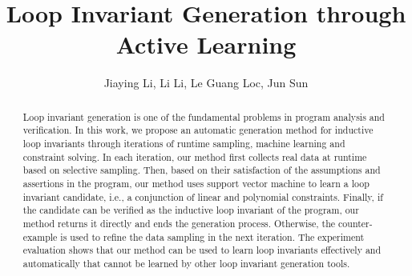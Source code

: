 \documentclass{llncs}
\begin{document}
\title{Loop Invariant Generation through Active Learning}
\author{
Jiaying Li, Li Li, Le Guang Loc, Jun Sun\\
}

\maketitle

\begin{abstract}
	Loop invariant generation is one of the fundamental problems in program analysis and verification. 
    In this work, we propose an automatic generation method for inductive loop invariants 
    through iterations of runtime sampling, machine learning and constraint solving. 
    In each iteration, our method first collects real data at runtime based on selective sampling. 
    Then, based on their satisfaction of the assumptions and assertions in the program, 
    our method uses support vector machine to learn a loop invariant candidate, 
    i.e., a conjunction of linear and polynomial constraints. 
    Finally, if the candidate can be verified as the inductive loop invariant of the program, 
    our method returns it directly and ends the generation process. 
    Otherwise, the counter-example is used to refine the data sampling in the next iteration. 
    The experiment evaluation shows that our method can be used to learn loop invariants 
    effectively and automatically that cannot be learned by other loop invariant generation tools. 
\end{abstract}












\end{document}
